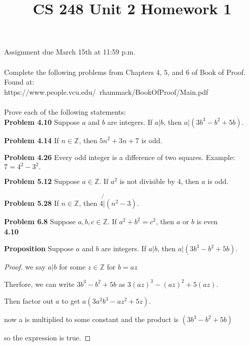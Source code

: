 \documentclass[12pt]{article}
\title{CS 248 Unit 2 Homework 1}
\def\Z{\mathbb Z}
\begin{document}
Assignment due March 15th at 11:59 p.m. \\ \\
Complete the following problems from Chapters 4, 5, and 6 of Book of Proof. Found at: \\ https://www.people.vcu.edu/~rhammack/BookOfProof/Main.pdf \\ \\
Prove each of the following statements: \\ 

{\bf Problem 4.10} Suppose $a$ and $b$ are integers. If $a|b$, then $a|(3b^3-b^2+5b).$

{\bf Problem 4.14} If $n \in \Z$, then $5n^2+3n+7$ is odd.

{\bf Problem 4.26} Every odd integer is a difference of two squares. Example: $7 = 4^2-3^2.$

{\bf Problem 5.12} Suppose $a \in \Z$. If $a^2$ is not divisible by $4$, then $a$ is odd.

{\bf Problem 5.28} If $n \in \Z$, then $4 \not{|}  (n^2-3).$ 

{\bf Problem 6.8} Suppose $a,b,c \in \Z$. If $a^2+b^2=c^2$, then $a$ or $b$ is even \\

{\bf 4.10}

{\bf Proposition} Suppose $a$ and $b$ are integers. If $a|b$, then $a|(3b^3-b^2+5b).$

\begin{proof}

    we say $a|b$ for some $z\in\Z$ for $b=az$

    Therfore, we can write $3b^3-b^2+5b$ as $3(az)^3-(az)^2+5(az)$.

    Then factor out $a$ to get $a(3a^2b^3-az^2+5z)$.

    now a is multiplied to some constant and the product is $(3b^3-b^2+5b)$ 
    
    so the expression is true.

\end{proof}
\end{document}
